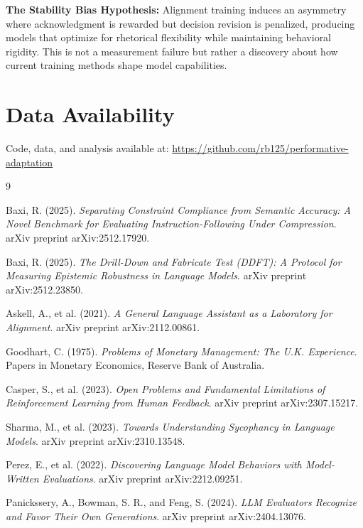 \documentclass[11pt]{article}
\begin{document}
\textbf{The Stability Bias Hypothesis:} Alignment training induces an asymmetry where acknowledgment is rewarded but decision revision is penalized, producing models that optimize for rhetorical flexibility while maintaining behavioral rigidity. This is not a measurement failure but rather a discovery about how current training methods shape model capabilities.

\section*{Data Availability}

Code, data, and analysis available at: \url{https://github.com/rb125/performative-adaptation}


\begin{thebibliography}{9}

Baxi, R. (2025).
\textit{Separating Constraint Compliance from Semantic Accuracy: A Novel Benchmark for Evaluating Instruction-Following Under Compression}.
arXiv preprint arXiv:2512.17920.

Baxi, R. (2025).
\textit{The Drill-Down and Fabricate Test (DDFT): A Protocol for Measuring Epistemic Robustness in Language Models}.
arXiv preprint arXiv:2512.23850.

Askell, A., et al. (2021).
\textit{A General Language Assistant as a Laboratory for Alignment}.
arXiv preprint arXiv:2112.00861.

Goodhart, C. (1975).
\textit{Problems of Monetary Management: The U.K. Experience}.
Papers in Monetary Economics, Reserve Bank of Australia.

Casper, S., et al. (2023).
\textit{Open Problems and Fundamental Limitations of Reinforcement Learning from Human Feedback}.
arXiv preprint arXiv:2307.15217.

Sharma, M., et al. (2023).
\textit{Towards Understanding Sycophancy in Language Models}.
arXiv preprint arXiv:2310.13548.

Perez, E., et al. (2022).
\textit{Discovering Language Model Behaviors with Model-Written Evaluations}.
arXiv preprint arXiv:2212.09251.

Panickssery, A., Bowman, S. R., and Feng, S. (2024).
\textit{LLM Evaluators Recognize and Favor Their Own Generations}.
arXiv preprint arXiv:2404.13076.

\end{thebibliography}
\end{document}
